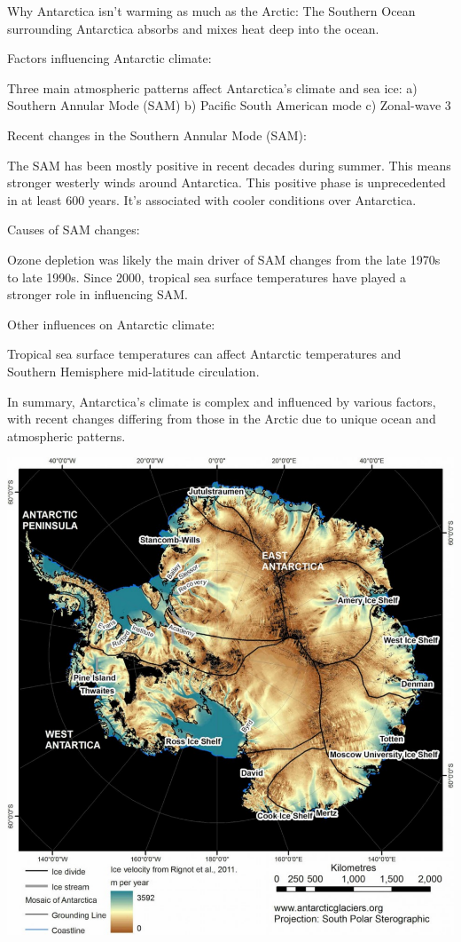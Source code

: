 Why Antarctica isn't warming as much as the Arctic:
The Southern Ocean surrounding Antarctica absorbs and mixes heat deep into the ocean\cite{L_T_C_C}.


Factors influencing Antarctic climate:

Three main atmospheric patterns affect Antarctica's climate and sea ice:
a) Southern Annular Mode (SAM)
b) Pacific South American mode
c) Zonal-wave 3


Recent changes in the Southern Annular Mode (SAM):

The SAM has been mostly positive in recent decades during summer.
This means stronger westerly winds around Antarctica.
This positive phase is unprecedented in at least 600 years.
It's associated with cooler conditions over Antarctica.


Causes of SAM changes:

Ozone depletion was likely the main driver of SAM changes from the late 1970s to late 1990s.
Since 2000, tropical sea surface temperatures have played a stronger role in influencing SAM.


Other influences on Antarctic climate:

Tropical sea surface temperatures can affect Antarctic temperatures and Southern Hemisphere mid-latitude circulation\cite{JACOBS_2004}.



In summary, Antarctica's climate is complex and influenced by various factors, with recent changes differing from those in the Arctic due to unique ocean and atmospheric patterns.

\begin{Figure}
\centering
\includegraphics[width=1.1\linewidth]{antarctica_velocity.pdf}
\label{fig:Antarctica_velocity}
\end{Figure}

